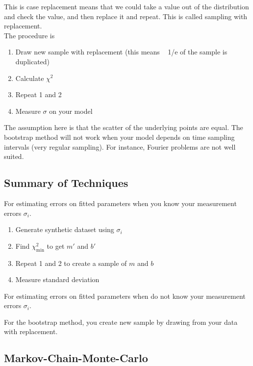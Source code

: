 \documentclass[]{article}
\begin{document}
This is case replacement means that we could take a value out of the distribution and check the value, and then replace it and repeat. This is called sampling with replacement. \\

The procedure is 

\begin{enumerate}
	\item Draw new sample with replacement (this means ~ 1/e of the sample is duplicated)
	\item Calculate $\chi^2$
	\item Repeat 1 and 2
	\item Measure $\sigma$ on your model
\end{enumerate}\bigbreak

The assumption here is that the scatter of the underlying points are equal. The bootstrap method will not work when your model depends on time sampling intervals (very regular sampling). For instance, Fourier problems are not well suited. \\


\subsection{Summary of Techniques}\bigbreak

For estimating errors on fitted parameters when you know your measurement errors $\sigma_i$.

\begin{enumerate}
	\item Generate synthetic dataset using $\sigma_i$
	\item Find $\chi^2_{\text{min}}$ to get $m'$ and $b'$
	\item Repeat 1 and 2 to create a sample of $m$ and $b$
	\item Measure standard deviation
\end{enumerate}\bigbreak

For estimating errors on fitted parameters when do not know your measurement errors $\sigma_i$.

For the bootstrap method, you create new sample by drawing from your data with replacement. \\


\subsection{Markov-Chain-Monte-Carlo}\bigbreak
\end{document}
